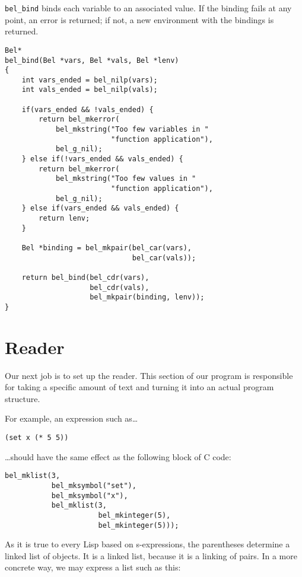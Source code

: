 \documentclass[openright,a4paper,twoside,12pt]{memoir}
\begin{document}
\texttt{bel\_bind} binds each variable to an associated value. If the binding
fails at any point, an error is returned; if not, a new environment
with the bindings is returned.

\begin{verbatim}
Bel*
bel_bind(Bel *vars, Bel *vals, Bel *lenv)
{
    int vars_ended = bel_nilp(vars);
    int vals_ended = bel_nilp(vals);

    if(vars_ended && !vals_ended) {
        return bel_mkerror(
            bel_mkstring("Too few variables in "
                         "function application"),
            bel_g_nil);
    } else if(!vars_ended && vals_ended) {
        return bel_mkerror(
            bel_mkstring("Too few values in "
                         "function application"),
            bel_g_nil);
    } else if(vars_ended && vals_ended) {
        return lenv;
    }

    Bel *binding = bel_mkpair(bel_car(vars),
                              bel_car(vals));

    return bel_bind(bel_cdr(vars),
                    bel_cdr(vals),
                    bel_mkpair(binding, lenv));
}
\end{verbatim}

\chapter{Reader}
\label{sec:org02cc93e}

Our next job is  to set up the reader. This section  of our program is
responsible for taking  a specific amount of text and  turning it into
an actual program structure.

For example, an expression such as\ldots{}

\begin{verbatim}
(set x (* 5 5))
\end{verbatim}

\ldots{}should have the same effect as the following block of C code:

\begin{verbatim}
bel_mklist(3,
           bel_mksymbol("set"),
           bel_mksymbol("x"),
           bel_mklist(3,
                      bel_mkinteger(5),
                      bel_mkinteger(5)));
\end{verbatim}

As it  is true to every  Lisp based on s-expressions,  the parentheses
determine a linked list of objects. It is a linked list, because it is
a linking of pairs. In a more concrete way, we may express a list such
as this:
\end{document}
